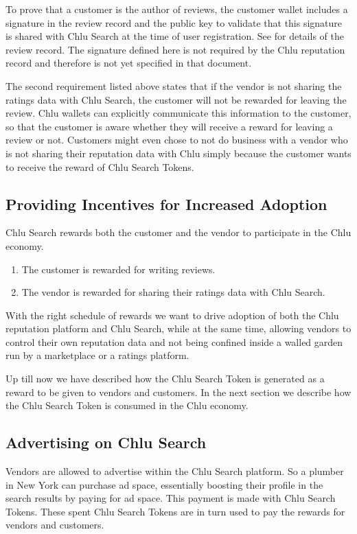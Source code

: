 \documentclass[a4paper]{article}
\begin{document}
To prove that a customer is the author of reviews, the customer wallet
includes a signature in the review record and the public key to
validate that this signature is shared with Chlu Search at the time of
user registration. See \cite{chlu-reputation} for details of the
review record. The signature defined here is not required by the Chlu
reputation record and therefore is not yet specified in that document.

The second requirement listed above states that if the vendor is not
sharing the ratings data with Chlu Search, the customer will not be
rewarded for leaving the review. Chlu wallets can explicitly
communicate this information to the customer, so that the customer is
aware whether they will receive a reward for leaving a review or
not. Customers might even chose to not do business with a vendor who
is not sharing their reputation data with Chlu simply because the
customer wants to receive the reward of Chlu Search Tokens.

\subsection{Providing Incentives for Increased Adoption}

Chlu Search rewards both the customer and the vendor to participate in
the Chlu economy.

\begin{enumerate}
\item The customer is rewarded for writing reviews.
\item The vendor is rewarded for sharing their ratings data with Chlu
  Search.
\end{enumerate}

With the right schedule of rewards we want to drive adoption of both
the Chlu reputation platform and Chlu Search, while at the same time,
allowing vendors to control their own reputation data and not being
confined inside a walled garden run by a marketplace or a ratings
platform.

Up till now we have described how the Chlu Search Token is generated
as a reward to be given to vendors and customers. In the next section
we describe how the Chlu Search Token is consumed in the Chlu economy.

\subsection{Advertising on Chlu Search}

Vendors are allowed to advertise within the Chlu Search platform. So a
plumber in New York can purchase ad space, essentially boosting their
profile in the search results by paying for ad space. This payment is
made with Chlu Search Tokens. These spent Chlu Search Tokens are in
turn used to pay the rewards for vendors and customers.
\end{document}
